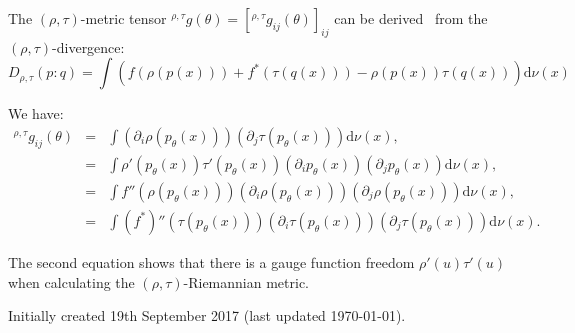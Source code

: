 \documentclass[11pt]{article}
\def\dnu{\mathrm{d}\nu}
\def\leftsup#1{{}^{#1}}
\begin{document}
The $(\rho,\tau)$-metric tensor  $\leftsup{\rho,\tau}g(\theta)=[\leftsup{\rho,\tau}g_{ij}(\theta)]_{ij}$ can be derived~\cite{nielsen2018elementary} from the $(\rho,\tau)$-divergence:
\begin{equation}
D_{\rho,\tau}(p:q)=\int \left( f(\rho(p(x))) + f^*(\tau(q(x))) - \rho(p(x))\tau(q(x)) \right)  \dnu(x)
\end{equation}

We have: 
\begin{eqnarray}
\leftsup{\rho,\tau}g_{ij}(\theta) &=& \int \left(\partial_i\rho(p_\theta(x))\right)   \left(\partial_j\tau(p_\theta(x))\right) \dnu(x),\\
&=& \int \rho'(p_\theta(x)) \tau'(p_\theta(x))  \left(\partial_i p_\theta(x) \right) \left(\partial_j p_\theta(x) \right)\dnu(x),\\
&=& \int f''(\rho(p_\theta(x)))  \left(\partial_i\rho(p_\theta(x))\right) \left(\partial_j\rho(p_\theta(x))\right)\dnu(x),\\
&=& \int (f^*)''(\tau(p_\theta(x))) \left(\partial_i\tau(p_\theta(x))\right) \left(\partial_j\tau(p_\theta(x))\right) \dnu(x).
\end{eqnarray} 

The second equation shows that there is a gauge function freedom $\rho'(u) \tau'(u)$ when calculating the  $(\rho,\tau)$-Riemannian metric.




\vskip 1cm
Initially created 19th September 2017 (last updated \today).



\end{document}
